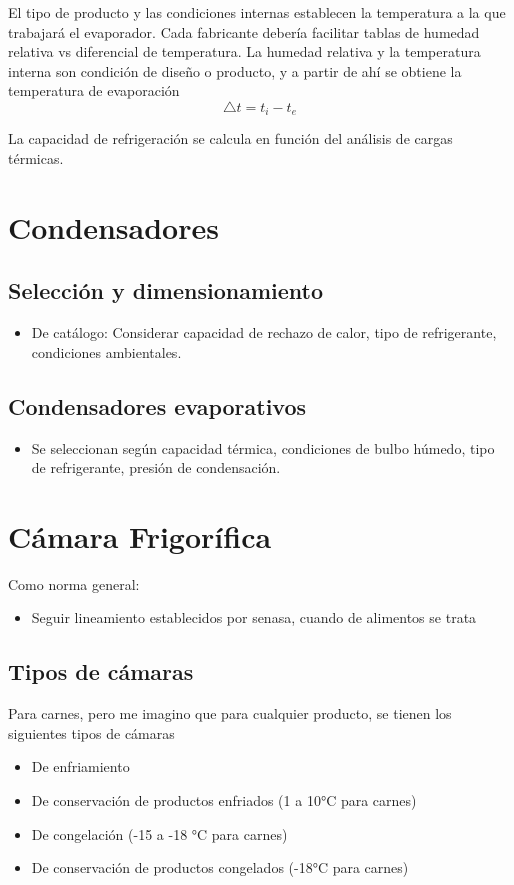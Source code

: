 El tipo de producto y las condiciones internas establecen la temperatura a la que trabajará el evaporador. Cada fabricante debería facilitar tablas de humedad relativa vs diferencial de temperatura. La humedad relativa y la temperatura interna son condición de diseño o producto, y a partir de ahí se obtiene la temperatura de evaporación
\[\triangle t = t_i - t_e\]

La capacidad de refrigeración se calcula en función del análisis de cargas térmicas.

\section{Condensadores}

\subsection{Selección y dimensionamiento}
\begin{itemize}
\item De catálogo: Considerar capacidad de rechazo de calor, tipo de refrigerante, condiciones ambientales.
\end{itemize}

\subsection{Condensadores evaporativos}
\begin{itemize}
\item Se seleccionan según capacidad térmica, condiciones de bulbo húmedo, tipo de refrigerante, presión de condensación.
\end{itemize}

\section{Cámara Frigorífica}
Como norma general:
\begin{itemize}
    \item Seguir lineamiento establecidos por senasa, cuando de alimentos se trata
\end{itemize}

\subsection{Tipos de cámaras}
Para carnes, pero me imagino que para cualquier producto, se tienen los siguientes tipos de cámaras
\begin{itemize}
    \item De enfriamiento
    \item De conservación de productos enfriados (1 a 10°C para carnes)
    \item De congelación (-15 a -18 °C para carnes)
    \item De conservación de productos congelados (-18°C para carnes)
\end{itemize}

